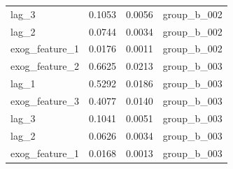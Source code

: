\begin{table}
\begin{tabular}{lrrl}
lag_3 & 0.1053 & 0.0056 & group_b_002 \\
lag_2 & 0.0744 & 0.0034 & group_b_002 \\
exog_feature_1 & 0.0176 & 0.0011 & group_b_002 \\
exog_feature_2 & 0.6625 & 0.0213 & group_b_003 \\
lag_1 & 0.5292 & 0.0186 & group_b_003 \\
exog_feature_3 & 0.4077 & 0.0140 & group_b_003 \\
lag_3 & 0.1041 & 0.0051 & group_b_003 \\
lag_2 & 0.0626 & 0.0034 & group_b_003 \\
exog_feature_1 & 0.0168 & 0.0013 & group_b_003 \\
\bottomrule
\end{tabular}
\end{table}
